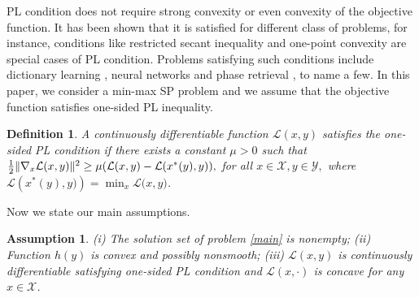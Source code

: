 \documentclass[letterpaper,11 pt]{article}
\newtheorem{assumption}{Assumption}
\newtheorem{definition}{Definition}
\def\ml{\mathcal L}
\newcommand{\mort}[1]{{\color{black}#1}}
\begin{document}
PL condition does not require strong convexity or even convexity of the objective function. 
It has been shown that it is satisfied for different class of problems, for instance, conditions like restricted secant inequality \cite{zhang2013gradient} and one-point convexity \cite{allen2018natasha} are special cases of PL condition. Problems satisfying such conditions include dictionary learning \cite{arora2015simple}, neural networks \cite{li2017convergence} and phase \mort{retrieval} \cite{chen2015solving}, to name a few. 
In this paper, we consider a min-max SP problem and we assume that the objective function satisfies one-sided PL inequality.
\begin{definition}\label{def PL}
A continuously differentiable function $\ml(x,y)$ satisfies the one-sided PL condition if there exists a constant $\mu>0$ such that ${1\over2}\|\nabla_x \ml{(x,y)}\|^2\geq \mu(\ml{(x,y)}- \ml({x^*(y),y)}),$ for all $x\in \mathcal X, y\in \mathcal Y,$
where $\ml({x^*(y),y)})=\min_x \ml({x,y)}$.
\end{definition}



Now we state our main assumptions.
 \begin{assumption}\label{assump0} (i) The solution set of problem \eqref{main} is nonempty; (ii)
Function $h(y)$ is convex and possibly nonsmooth; (iii) $\ml(x,y)$ is continuously differentiable satisfying one-sided PL condition and $\ml(x,\cdot)$ is concave for any $x\in \mathcal X$.
\end{assumption}
\end{document}
